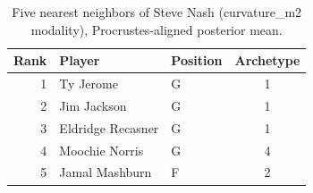\begin{table}[htbp]
  \centering\small
  \begin{tabular}{rllc}
    \toprule
    Rank & Player & Position & Archetype \\
    \midrule
    1 & Ty Jerome & G & 1 \\
    2 & Jim Jackson & G & 1 \\
    3 & Eldridge Recasner & G & 1 \\
    4 & Moochie Norris & G & 4 \\
    5 & Jamal Mashburn & F & 2 \\
    \bottomrule
  \end{tabular}
  \caption{Five nearest neighbors of Steve Nash (curvature_m2 modality), Procrustes-aligned posterior mean.}
  \label{tab:Steve_Nash_neighbors_curvature_m2}
\end{table}

